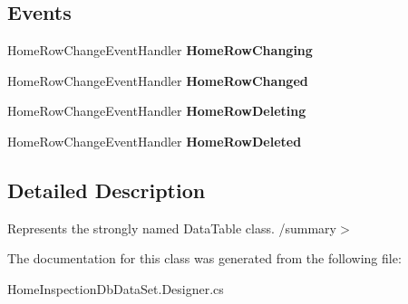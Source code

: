 \subsection*{Events}
\begin{DoxyCompactItemize}
\item 
\mbox{\label{class_a_f_h___scheduler_1_1_home_inspection_db_data_set_1_1_home_data_table_a0a4bbf588b14c8a854746aae82f49537}} 
Home\+Row\+Change\+Event\+Handler {\bfseries Home\+Row\+Changing}
\item 
\mbox{\label{class_a_f_h___scheduler_1_1_home_inspection_db_data_set_1_1_home_data_table_afa82e8bf6ce99a085433934fe25dcedd}} 
Home\+Row\+Change\+Event\+Handler {\bfseries Home\+Row\+Changed}
\item 
\mbox{\label{class_a_f_h___scheduler_1_1_home_inspection_db_data_set_1_1_home_data_table_afd6b6425f9994d35a7a66fb7ae3f49b8}} 
Home\+Row\+Change\+Event\+Handler {\bfseries Home\+Row\+Deleting}
\item 
\mbox{\label{class_a_f_h___scheduler_1_1_home_inspection_db_data_set_1_1_home_data_table_a0d212500ca2932d99e53539441d2bb1c}} 
Home\+Row\+Change\+Event\+Handler {\bfseries Home\+Row\+Deleted}
\end{DoxyCompactItemize}


\subsection{Detailed Description}
Represents the strongly named Data\+Table class. /summary$>$ 

The documentation for this class was generated from the following file\+:\begin{DoxyCompactItemize}
\item 
Home\+Inspection\+Db\+Data\+Set.\+Designer.\+cs\end{DoxyCompactItemize}
